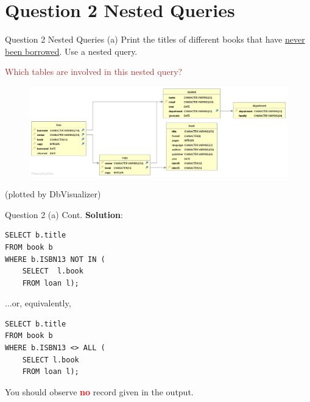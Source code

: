 \section*{Question 2 Nested Queries}

\begin{frame}[fragile]{Question 2 Nested Queries (a)}
Print the titles of different books that have \underline{never been borrowed}. Use a nested query.\\ \vspace{5pt}

\textcolor{brown}{Which tables are involved in this nested query?}
\begin{figure}
	\includegraphics[width=1\textwidth]{t1/images/t1-end.png}
\end{figure}\vspace{-10pt}
{\tiny(plotted by DbVisualizer)}
\end{frame}

\begin{frame}[fragile]{Question 2 (a) Cont.}
\textbf{Solution}:

\begin{lstlisting}
SELECT b.title 
FROM book b
WHERE b.ISBN13 NOT IN (
	SELECT  l.book 
	FROM loan l);
\end{lstlisting}\vspace{5pt}

...or, equivalently,

\begin{lstlisting}
SELECT b.title 
FROM book b
WHERE b.ISBN13 <> ALL (
	SELECT l.book 
	FROM loan l);
\end{lstlisting}\vspace{5pt}

You should observe \textcolor{red}{\textbf{no}} record given in the output. 
\end{frame}

